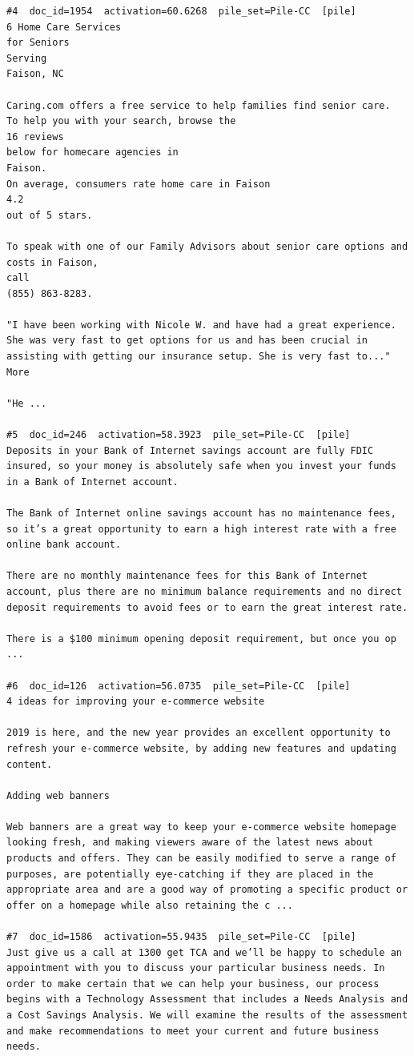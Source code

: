 \begin{verbatim}
#4  doc_id=1954  activation=60.6268  pile_set=Pile-CC  [pile]
6 Home Care Services
for Seniors
Serving
Faison, NC

Caring.com offers a free service to help families find senior care.
To help you with your search, browse the
16 reviews
below for homecare agencies in
Faison.
On average, consumers rate home care in Faison
4.2
out of 5 stars.

To speak with one of our Family Advisors about senior care options and costs in Faison,
call
(855) 863-8283.

"I have been working with Nicole W. and have had a great experience. She was very fast to get options for us and has been crucial in assisting with getting our insurance setup. She is very fast to..." More

"He ...

#5  doc_id=246  activation=58.3923  pile_set=Pile-CC  [pile]
Deposits in your Bank of Internet savings account are fully FDIC insured, so your money is absolutely safe when you invest your funds in a Bank of Internet account.

The Bank of Internet online savings account has no maintenance fees, so it’s a great opportunity to earn a high interest rate with a free online bank account.

There are no monthly maintenance fees for this Bank of Internet account, plus there are no minimum balance requirements and no direct deposit requirements to avoid fees or to earn the great interest rate.

There is a $100 minimum opening deposit requirement, but once you op ...

#6  doc_id=126  activation=56.0735  pile_set=Pile-CC  [pile]
4 ideas for improving your e-commerce ​website

2019 is here, and the new year provides an excellent opportunity to refresh your e-commerce website, by adding new features and updating content.

Adding web banners

Web banners are a great way to keep your e-commerce website homepage looking fresh, and making viewers aware of the latest news about products and offers. They can be easily modified to serve a range of purposes, are potentially eye-catching if they are placed in the appropriate area and are a good way of promoting a specific product or offer on a homepage while also retaining the c ...

#7  doc_id=1586  activation=55.9435  pile_set=Pile-CC  [pile]
Just give us a call at 1300 get TCA and we’ll be happy to schedule an appointment with you to discuss your particular business needs. In order to make certain that we can help your business, our process begins with a Technology Assessment that includes a Needs Analysis and a Cost Savings Analysis. We will examine the results of the assessment and make recommendations to meet your current and future business needs.


\end{verbatim}
